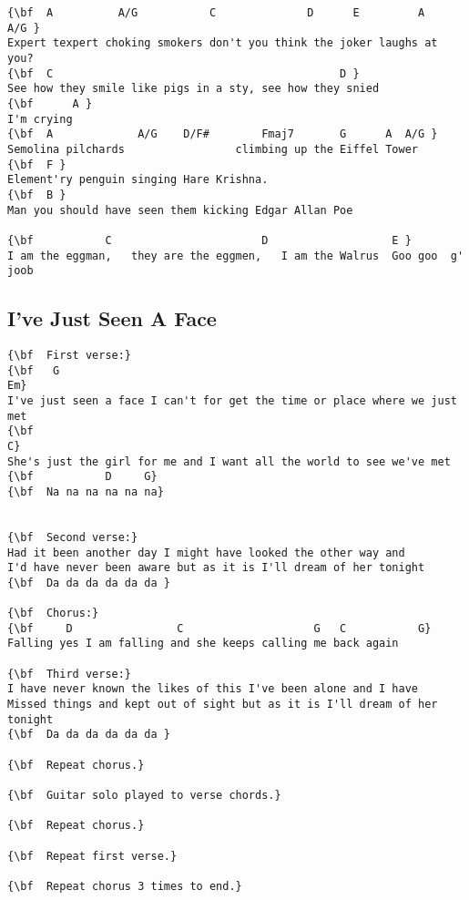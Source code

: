 \documentclass[a4paper]{article}
\begin{document}
\begin{Verbatim}[commandchars=\\\{\}]
{\bf  A          A/G           C              D      E         A    A/G }
Expert texpert choking smokers don't you think the joker laughs at you? 
{\bf  C                                            D }
See how they smile like pigs in a sty, see how they snied 
{\bf      A }
I'm crying 
{\bf  A             A/G    D/F#        Fmaj7       G      A  A/G }
Semolina pilchards                 climbing up the Eiffel Tower 
{\bf  F }
Element'ry penguin singing Hare Krishna.  
{\bf  B }
Man you should have seen them kicking Edgar Allan Poe 

{\bf           C                       D                   E }
I am the eggman,   they are the eggmen,   I am the Walrus  Goo goo  g' joob

\end{Verbatim}
\newpage
\subsection{I've Just Seen A Face}
\begin{Verbatim}[commandchars=\\\{\}]
{\bf  First verse:}
{\bf   G                                                                    Em}
I've just seen a face I can't for get the time or place where we just met
{\bf                                                                    C}
She's just the girl for me and I want all the world to see we've met
{\bf           D     G}
{\bf  Na na na na na na}


{\bf  Second verse:}
Had it been another day I might have looked the other way and
I'd have never been aware but as it is I'll dream of her tonight
{\bf  Da da da da da da }

{\bf  Chorus:}
{\bf     D                C                    G   C           G}
Falling yes I am falling and she keeps calling me back again

{\bf  Third verse:}
I have never known the likes of this I've been alone and I have 
Missed things and kept out of sight but as it is I'll dream of her tonight
{\bf  Da da da da da da }

{\bf  Repeat chorus.}

{\bf  Guitar solo played to verse chords.}

{\bf  Repeat chorus.}

{\bf  Repeat first verse.}

{\bf  Repeat chorus 3 times to end.}


\end{Verbatim}
\newpage
\end{document}
